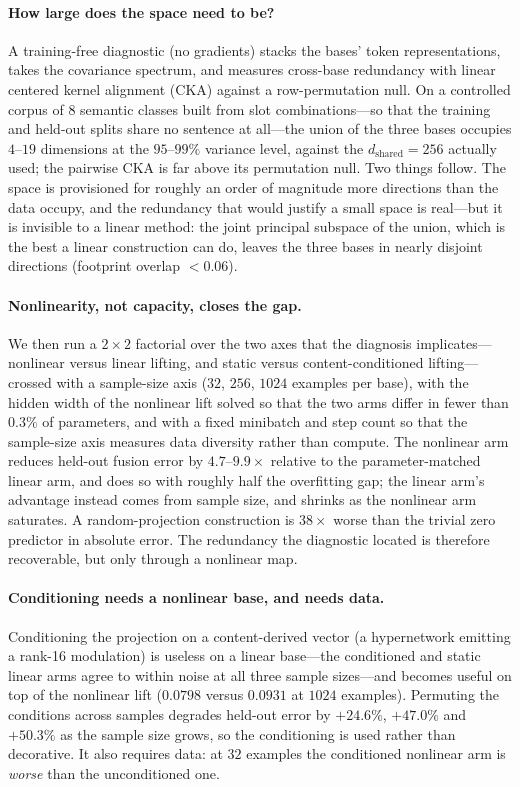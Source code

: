 \documentclass[10pt,twoside]{article}
\theoremstyle{definition}
\theoremstyle{plain}
\theoremstyle{remark}
\begin{document}
\paragraph{How large does the space need to be?}
A training-free diagnostic (no gradients) stacks the bases' token representations, takes the
covariance spectrum, and measures cross-base redundancy with linear centered kernel alignment
(CKA) against a row-permutation null. On a controlled corpus of $8$ semantic classes built from
slot combinations---so that the training and held-out splits share no sentence at all---the union of
the three bases occupies $4$--$19$ dimensions at the $95$--$99\%$ variance level, against the
$d_{\text{shared}}{=}256$ actually used; the pairwise CKA is far above its permutation null. Two
things follow. The space is provisioned for roughly an order of magnitude more directions than the
data occupy, and the redundancy that would justify a small space is real---but it is invisible to
a linear method: the joint principal subspace of the union, which is the best a linear
construction can do, leaves the three bases in nearly disjoint directions (footprint overlap
$<0.06$).

\paragraph{Nonlinearity, not capacity, closes the gap.}
We then run a $2\times2$ factorial over the two axes that the diagnosis implicates---nonlinear
versus linear lifting, and static versus content-conditioned lifting---crossed with a sample-size
axis ($32$, $256$, $1024$ examples per base), with the hidden width of the nonlinear lift solved
so that the two arms differ in fewer than $0.3\%$ of parameters, and with a fixed minibatch and
step count so that the sample-size axis measures data diversity rather than compute. The
nonlinear arm reduces held-out fusion error by $4.7$--$9.9\times$ relative to the
parameter-matched linear arm, and does so with roughly half the overfitting gap; the linear arm's
advantage instead comes from sample size, and shrinks as the nonlinear arm saturates. A
random-projection construction is $38\times$ worse than the trivial zero predictor in absolute
error. The redundancy the diagnostic located is therefore recoverable, but only through a nonlinear
map.

\paragraph{Conditioning needs a nonlinear base, and needs data.}
Conditioning the projection on a content-derived vector (a hypernetwork emitting a rank-16
modulation) is useless on a linear base---the conditioned and static linear arms agree to within
noise at all three sample sizes---and becomes useful on top of the nonlinear lift
($0.0798$ versus $0.0931$ at $1024$ examples). Permuting the conditions across samples
degrades held-out error by $+24.6\%$, $+47.0\%$ and $+50.3\%$ as the sample size grows, so the
conditioning is used rather than decorative. It also requires data: at $32$ examples the
conditioned nonlinear arm is \emph{worse} than the unconditioned one.
\end{document}
